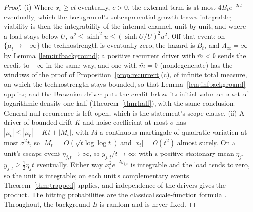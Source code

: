 \begin{proof}
(i) Where $x_t\ge ct$ eventually, $c>0$, the external term is at most
$4B_te^{-2ct}$ eventually, which the background's subexponential growth
leaves integrable; viability is then the integrability of the internal
channel, unit by unit, and where a load stays below $U$,
$u^2\le\sinh^2u\le(\sinh U/U)^2u^2$. Off that event: on
$\{\mu_t\to-\infty\}$ the technostrength is eventually zero, the hazard is
$B_t$, and $\Lambda_\infty=\infty$ by Lemma~\ref{lem:infbackground}; a
positive recurrent driver with $\bar m<0$ sends the credit to $-\infty$ in
the same way, and one with $\bar m=0$ (nondegenerate) has the windows of
the proof of Proposition~\ref{prop:recurrent}(c), of infinite total
measure, on which the technostrength stays bounded, so that
Lemma~\ref{lem:infbackground} applies; and the Brownian driver puts the
credit below its initial value on a set of logarithmic density one half
(Theorem~\ref{thm:half}), with the same conclusion. General null
recurrence is left open, which is the statement's scope clause. (ii) A
driver of bounded drift $K$ and noise coefficient at most $\bar\sigma$ has
$|\mu_t|\le|\mu_0|+Kt+|M_t|$, with $M$ a continuous martingale of quadratic
variation at most $\bar\sigma^2t$, so $|M_t|=O(\sqrt{t\log\log t})$ and
$|x_t|=O(t^2)$ almost surely. On a unit's escape event
$\eta_{j,t}\to\infty$, so $y_{j,t}/t\to\infty$; with a positive stationary
mean $\bar\eta_j$, $y_{j,t}\ge\tfrac12\bar\eta_jt$ eventually. Either way
$x_t^2e^{-2y_{j,t}}$ is integrable and the load tends to zero, so the unit
is integrable; on each unit's complementary events
Theorem~\ref{thm:trapped} applies, and independence of the drivers gives
the product. The hitting probabilities are the classical scale-function
formula \cite{KT81,RY99}. Throughout, the background $B$ is random and is
never fixed.
\end{proof}


